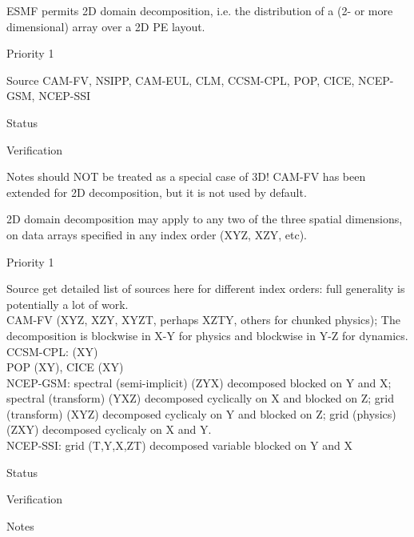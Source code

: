 
ESMF permits 2D domain decomposition, i.e. the distribution of a
(2- or more dimensional) array over a 2D PE layout.

\begin{reqlist}
\item[Priority] 1
\item[Source] CAM-FV, NSIPP, CAM-EUL, CLM, CCSM-CPL, POP, CICE, NCEP-GSM, NCEP-SSI \\
\item[Status]
\item[Verification]
\item[Notes] should NOT be treated as a special case of 3D!
	CAM-FV has been extended for 2D decomposition, but 
	it is not used by default.
\end{reqlist}


2D domain decomposition may apply to any two of the three spatial
dimensions, on data arrays specified in any index order (XYZ, XZY,
etc).

\begin{reqlist}
\item[Priority] 1
\item[Source] get detailed list of sources here for different index
  orders: full generality is potentially a lot of work. \\
  CAM-FV  (XYZ, XZY, XYZT, perhaps XZTY, others for chunked physics);
  The decomposition is blockwise in X-Y for physics and blockwise in 
  Y-Z for dynamics.  \\
  CCSM-CPL: (XY) \\
  POP (XY), CICE (XY) \\
  NCEP-GSM: spectral (semi-implicit) (ZYX) decomposed blocked on Y and X; 
            spectral (transform) (YXZ) decomposed cyclically on X and blocked on Z;
            grid (transform) (XYZ) decomposed cyclicaly on Y and blocked on Z; 
            grid (physics) (ZXY) decomposed cyclicaly on X and Y. \\
  NCEP-SSI: grid (T,Y,X,ZT) decomposed variable blocked on Y and X \\
\item[Status]
\item[Verification]
\item[Notes]
\end{reqlist}



